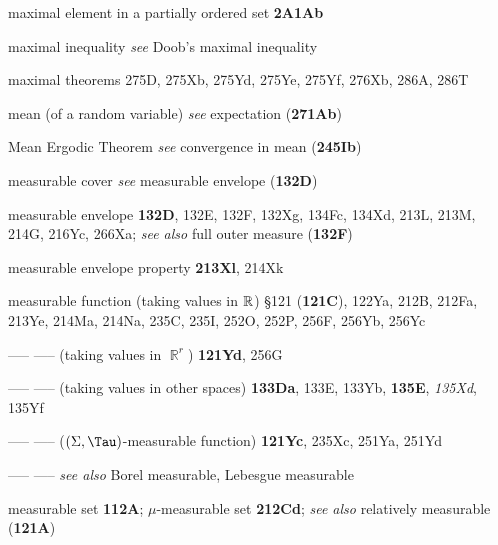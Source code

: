 

maximal element in a partially ordered set {\bf 2A1Ab}








maximal inequality {\it see} Doob's maximal inequality


maximal theorems 275D, 275Xb, 275Yd, 275Ye, 275Yf,
276Xb, 286A, 286T


















mean (of a random variable) {\it see} expectation ({\bf 271Ab})




{Mean Ergodic Theorem }
  {\it see} convergence in mean ({\bf 245Ib})








measurable cover {\it see} measurable envelope ({\bf 132D})

measurable envelope {\bf 132D}, 132E, 132F, 132Xg, 134Fc, 134Xd,
  213L, 213M, 214G, 216Yc, 266Xa;  
  {\it see also }
  full outer measure ({\bf 132F})

measurable envelope property {\bf 213Xl}, 214Xk


measurable function (taking values in $\Bbb R$) \S121 ({\bf 121C}),
122Ya,
  212B, 212Fa, 213Ye, 214Ma, 214Na, 235C, 235I, 252O, 252P, 256F, 256Yb,
256Yc

----- -----  (taking values in $\BbbR^r$) {\bf 121Yd},
  256G
  

----- -----  (taking values in other spaces) {\bf 133Da}, 133E, 133Yb,
{\bf 135E}, {\it 135Xd}, 135Yf  

----- ----- ($(\Sigma,\Tau)$-measurable function) {\bf 121Yc},
  235Xc, 251Ya, 251Yd
  

----- -----  {\it see also} Borel measurable, Lebesgue measurable






measurable set {\bf 112A};
  $\mu$-measurable set {\bf 212Cd};
  {\it see also }
relatively measurable ({\bf 121A})


